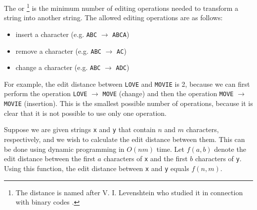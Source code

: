 The  or \footnote{The distance
is named after V. I. Levenshtein who studied it in connection with binary codes \cite{lev66}.}
is the minimum number of editing operations
needed to transform a string
into another string.
The allowed editing operations are as follows:
\begin{itemize}
\item insert a character (e.g. \texttt{ABC} $\rightarrow$ \texttt{ABCA})
\item remove a character (e.g. \texttt{ABC} $\rightarrow$ \texttt{AC})
\item change a character (e.g. \texttt{ABC} $\rightarrow$ \texttt{ADC})
\end{itemize}

For example, the edit distance between
\texttt{LOVE} and \texttt{MOVIE} is 2,
because we can first perform the operation
 \texttt{LOVE} $\rightarrow$ \texttt{MOVE}
(change) and then the operation
\texttt{MOVE} $\rightarrow$ \texttt{MOVIE}
(insertion).
This is the smallest possible number of operations,
because it is clear that it is not possible
to use only one operation.

Suppose we are given strings
\texttt{x} and \texttt{y} that contain
$n$ and $m$ characters, respectively,
and we wish to calculate the edit distance
between them.
This can be done using
dynamic programming in $O(nm)$ time.
Let $f(a,b)$ denote the edit distance
between the first $a$ characters of \texttt{x}
and the first $b$ characters of \texttt{y}.
Using this function, the edit distance between
\texttt{x} and \texttt{y} equals $f(n,m)$.

